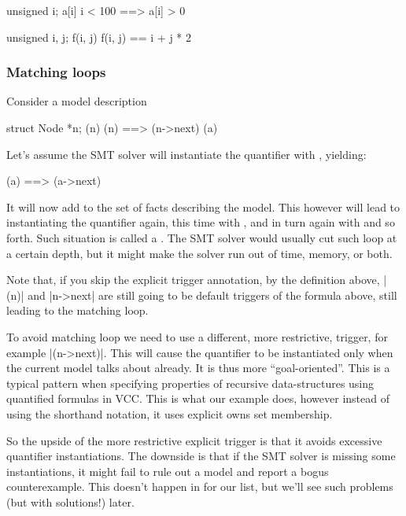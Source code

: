 
\begin{VCC}
\forall unsigned i; {a[i]} i < 100 ==> a[i] > 0
\end{VCC}

\begin{VCC}
\forall unsigned i, j; {f(i, j)} f(i, j) == i + j * 2
\end{VCC}

\subsubsection{Matching loops}

Consider a model description
\begin{VCC}
\forall struct Node *n; {\mine(n)} \mine(n) ==> \mine(n->next)
\mine(a)
\end{VCC}
Let's assume the SMT solver will instantiate the quantifier with , yielding:
\begin{VCC}
\mine(a) ==> \mine(a->next)
\end{VCC}
It will now add  to the set of facts
describing the model.
This however will lead to instantiating the quantifier again,
this time with , and in turn again with
 and so forth.
Such situation is called a .
The SMT solver would usually cut such loop at a certain depth,
but it might make the solver run out of time, memory, or both.

Note that, if you skip the explicit trigger annotation, by the definition
above, \vcc|{\mine(n)}| and \vcc|{n->next}| are still going to be default
triggers of the formula above, still leading to the matching loop.

To avoid matching loop we need to use a different, more restrictive,
trigger, for example \vcc|{\mine(n->next)}|.
This will cause the quantifier to be instantiated only when the current
model talks about  already.
It is thus more ``goal-oriented''.
This is a typical pattern when specifying properties of recursive data-structures
using quantified formulas in VCC.
This is what our example does, however instead of using the shorthand
notation, it uses explicit owns set membership.

So the upside of the more restrictive explicit trigger is that it avoids
excessive quantifier instantiations.
The downside is that if the SMT solver is missing some instantiations,
it might fail to rule out a model and report a bogus counterexample.
This doesn't happen in for our list, but we'll see such problems
(but with solutions!) later.

